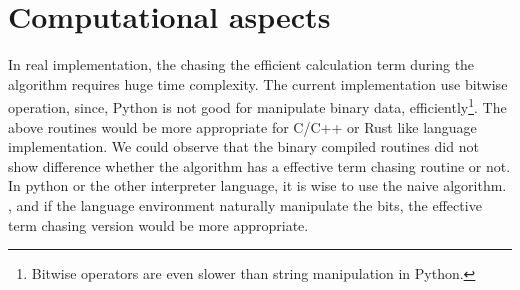 \documentclass[twocolumn]{article}
\begin{document}
\section{Computational aspects}
In real implementation, the chasing the efficient calculation term during 
the algorithm requires huge time complexity.
The current implementation use bitwise operation, since, Python is not good for 
manipulate binary data, efficiently\footnote{Bitwise operators are even slower than string manipulation in Python.}. 
The above routines would be more appropriate for C/C++ or Rust like language implementation.
We could observe that the binary compiled routines did not show difference 
whether the algorithm has a effective term chasing routine or not.
In python or the other interpreter language, it is wise to use the naive algorithm.
, and if the language environment naturally manipulate the bits, the effective term chasing version
would be more appropriate.

\end{document}
